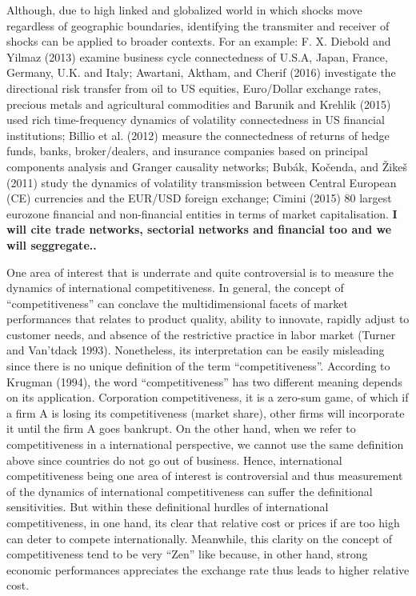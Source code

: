 \documentclass[]{elsarticle} %
\begin{document}
Although, due to high linked and globalized world in which shocks move
regardless of geographic boundaries, identifying the transmiter and
receiver of shocks can be applied to broader contexts. For an example:
F. X. Diebold and Yilmaz (2013) examine business cycle connectedness of
U.S.A, Japan, France, Germany, U.K. and Italy; Awartani, Aktham, and
Cherif (2016) investigate the directional risk transfer from oil to US
equities, Euro/Dollar exchange rates, precious metals and agricultural
commodities and Barunik and Krehlik (2015) used rich time-frequency
dynamics of volatility connectedness in US financial institutions;
Billio et al. (2012) measure the connectedness of returns of hedge
funds, banks, broker/dealers, and insurance companies based on principal
components analysis and Granger causality networks; Bubák, Kočenda, and
Žikeš (2011) study the dynamics of volatility transmission between
Central European (CE) currencies and the EUR/USD foreign exchange;
Cimini (2015) 80 largest eurozone financial and non-financial entities
in terms of market capitalisation. \textbf{I will cite trade networks,
sectorial networks and financial too and we will seggregate..}

One area of interest that is underrate and quite controversial is to
measure the dynamics of international competitiveness. In general, the
concept of ``competitiveness'' can conclave the multidimensional facets
of market performances that relates to product quality, ability to
innovate, rapidly adjust to customer needs, and absence of the
restrictive practice in labor market (Turner and Van'tdack 1993).
Nonetheless, its interpretation can be easily misleading since there is
no unique definition of the term ``competitiveness''. According to
Krugman (1994), the word ``competitiveness'' has two different meaning
depends on its application. Corporation competitiveness, it is a
zero-sum game, of which if a firm A is losing its competitiveness
(market share), other firms will incorporate it until the firm A goes
bankrupt. On the other hand, when we refer to competitiveness in a
international perspective, we cannot use the same definition above since
countries do not go out of business. Hence, international
competitiveness being one area of interest is controversial and thus
measurement of the dynamics of international competitiveness can suffer
the definitional sensitivities. But within these definitional hurdles of
international competitiveness, in one hand, its clear that relative cost
or prices if are too high can deter to compete internationally.
Meanwhile, this clarity on the concept of competitiveness tend to be
very ``Zen'' like because, in other hand, strong economic performances
appreciates the exchange rate thus leads to higher relative cost.
\end{document}
